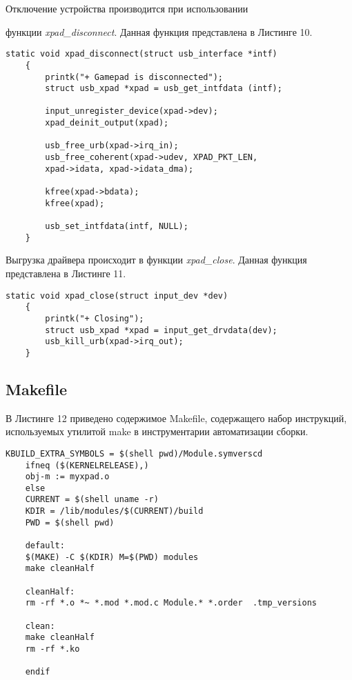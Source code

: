 Отключение устройства производится при использовании 

функции \textit{xpad\_disconnect}.
Данная функция представлена в Листинге 10.

\begin{lstlisting}[caption=Функция xpad\_disconnect]
	static void xpad_disconnect(struct usb_interface *intf)
	{
		printk("+ Gamepad is disconnected");
		struct usb_xpad *xpad = usb_get_intfdata (intf);
		
		input_unregister_device(xpad->dev);
		xpad_deinit_output(xpad);									
		
		usb_free_urb(xpad->irq_in);
		usb_free_coherent(xpad->udev, XPAD_PKT_LEN,
		xpad->idata, xpad->idata_dma);
		
		kfree(xpad->bdata);
		kfree(xpad);
		
		usb_set_intfdata(intf, NULL);
	}
\end{lstlisting}

Выгрузка драйвера происходит в функции \textit{xpad\_close}.
Данная функция представлена в Листинге 11.

\begin{lstlisting}[caption=Функция xpad\_close]
	static void xpad_close(struct input_dev *dev)
	{
		printk("+ Closing");
		struct usb_xpad *xpad = input_get_drvdata(dev);
		usb_kill_urb(xpad->irq_out);
	}
\end{lstlisting}

\subsection{Makefile}
В Листинге 12 приведено содержимое Makefile, содержащего набор
инструкций, используемых утилитой make в инструментарии автоматизации
сборки. 

\begin{lstlisting}[caption=Makefile]
	KBUILD_EXTRA_SYMBOLS = $(shell pwd)/Module.symverscd
	ifneq ($(KERNELRELEASE),)
	obj-m := myxpad.o
	else
	CURRENT = $(shell uname -r)
	KDIR = /lib/modules/$(CURRENT)/build
	PWD = $(shell pwd)
	
	default:
	$(MAKE) -C $(KDIR) M=$(PWD) modules
	make cleanHalf
	
	cleanHalf:
	rm -rf *.o *~ *.mod *.mod.c Module.* *.order  .tmp_versions
	
	clean:
	make cleanHalf
	rm -rf *.ko
	
	endif
\end{lstlisting}
\pagebreak